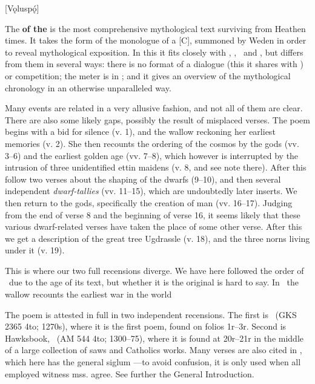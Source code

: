 [Vǫluspǫ́]


The \textbf{ of the } is the most comprehensive mythological text surviving from Heathen times. It takes the form of the monologue of a [C], summoned by Weden in order to reveal mythological exposition. In this it fits closely with \Vafthrudnismal, \Grimnismal, \Sigrdrifumal\ and \Allvismal, but differs from them in several ways: there is no format of a dialogue (this it shares with \Grimnismal) or competition; the meter is in \Fornyrdislag; and it gives an overview of the mythological chronology in an otherwise unparalleled way.

Many events are related in a very allusive fashion, and not all of them are clear. There are also some likely gaps, possibly the result of misplaced verses. The poem begins with a bid for silence (v. 1), and the wallow reckoning her earliest memories (v. 2). She then recounts the ordering of the cosmos by the gods (vv. 3–6) and the earliest golden age (vv. 7–8), which however is interrupted by the intrusion of three unidentified ettin maidens (v. 8, and see note there). After this follow two verses about the shaping of the dwarfs (9–10), and then several independent \emph{dwarf-tallies} (vv. 11–15), which are undoubtedly later inserts. We then return to the gods, specifically the creation of man (vv. 16–17). Judging from the end of verse 8 and the beginning of verse 16, it seems likely that these various dwarf-related verses have taken the place of some other verse. After this we get a description of the great tree Ugdrassle (v. 18), and the three norns living under it (v. 19).

This is where our two full recensions diverge. We have here followed the order of \Regius\ due to the age of its text, but whether it is the original is hard to say. In \Regius\ the wallow recounts the earliest war in the world

The poem is attested in full in two independent recensions. The first is \Regius\ (GKS 2365 4to; 1270s), where it is the first poem, found on folios 1r–3r. Second is Hawksbook, \Hauksbok\ (AM 544 4to; 1300–75), where it is found at 20r–21r in the middle of a large collection of saws and Catholics works. Many verses are also cited in \Gylfaginning, which here has the general siglum \GylfMS—to avoid confusion, it is only used when all employed witness mss. agree. See further the General Introduction. %


